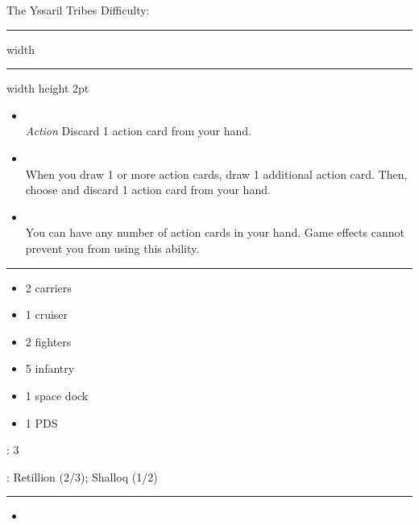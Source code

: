 {\handel\Huge The Yssaril Tribes} \hfill {\Large Difficulty: \medium} \vspace{-4pt}\\
\hrule width \hsize \kern 1mm \hrule width \hsize height 2pt


\begin{multicols}{2}


\begin{itemize}
\item {}\\
\emph{Action} Discard 1 action card from your hand.
\item {}\\
When you draw 1 or more action cards, draw 1 additional action card. Then, choose and discard 1 action card from your hand.
\item {}\\
You can have any number of action cards in your hand. Game effects cannot prevent you from using this ability.
\end{itemize}


\vspace{-10pt}\rule{\hsize}{0.4pt}\vspace{5pt}


\vspace{-5pt}
\begin{multicols}{2}
\begin{itemize}
\item 2 carriers
\item 1 cruiser
\item 2 fighters
\item 5 infantry
\item 1 space dock
\item 1 PDS
\end{itemize}
\end{multicols}

\vspace{-5pt}
: 3

\vspace{2pt}
: Retillion (2/3); Shalloq (1/2)

\rule{\hsize}{0.4pt}\vspace{5pt}


\begin{itemize}
\item \neural
\end{itemize}


\end{multicols}
